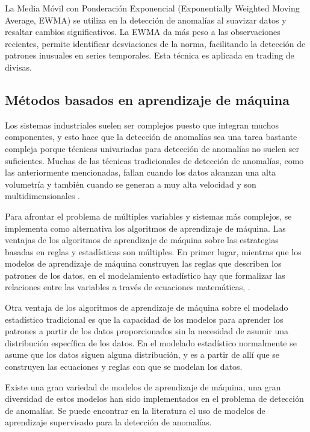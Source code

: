 \documentclass[11pt,a4paper,spanish]{book}
\numberwithin{equation}{chapter}
\numberwithin{figure}{chapter}
\begin{document}
La Media Móvil con Ponderación Exponencial (Exponentially Weighted Moving Average, EWMA) \cite{fan1996ewma} se utiliza en la detección de anomalías al suavizar datos y resaltar cambios significativos. La EWMA da más peso a las observaciones recientes, permite identificar desviaciones de la norma, facilitando la detección de patrones inusuales en series temporales. Esta técnica es aplicada en trading de divisas. 


\subsection{Métodos basados en aprendizaje de máquina}


Los sistemas industriales suelen ser complejos puesto que integran muchos componentes, y esto hace que la detección de anomalías sea una tarea bastante compleja porque técnicas univariadas para detección de anomalías no suelen ser suficientes. Muchas de las técnicas tradicionales de detección de anomalías, como las anteriormente mencionadas, fallan cuando los datos alcanzan una alta volumetría y también cuando se generan a muy alta velocidad y son multidimensionales \cite{thudumu2020survey}.


Para afrontar el problema de múltiples variables y sistemas más complejos, se implementa como alternativa los algoritmos de aprendizaje de máquina. Las ventajas de los algoritmos de aprendizaje de máquina sobre las estrategias basadas en reglas y estadísticas son múltiples. En primer lugar, mientras que los modelos de aprendizaje de máquina construyen las reglas que describen los patrones de los datos, en el modelamiento estadístico hay que formalizar las relaciones entre las variables a través de ecuaciones matemáticas, \cite{ij2018statvsml}. 


Otra ventaja de los algoritmos de aprendizaje de máquina sobre el modelado estadístico tradicional es que la capacidad de los modelos para aprender los patrones a partir de los datos proporcionados sin la necesidad de asumir una distribución específica de los datos. En el modelado estadístico normalmente se asume que los datos siguen alguna distribución, y es a partir de allí que se construyen las ecuaciones y reglas con que se modelan los datos. 


Existe una gran variedad de modelos de aprendizaje de máquina, una gran diversidad de estos modelos han sido implementados en el problema de detección de anomalías. Se puede encontrar en la literatura el uso de modelos de aprendizaje supervisado para la detección de anomalías. 
\end{document}
